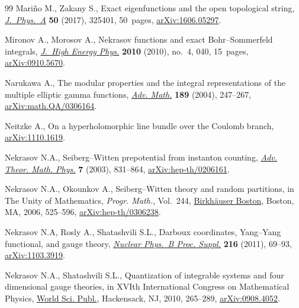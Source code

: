 \documentclass[pdftex]{sigma}
\numberwithin{equation}{section}
\begin{document}
\begin{thebibliography}{99}
Mari\~no M., Zakany S., Exact eigenfunctions and the open topological string,
 \href{https://doi.org/10.1088/1751-8121/aa791e}{\textit{J.~Phys.~A}} \textbf{50} (2017), 325401, 50~pages,
 \href{https://arxiv.org/abs/1606.05297}{arXiv:1606.05297}.

Mironov A., Morosov A., Nekrasov functions and exact {B}ohr--{S}ommerfeld
 integrals, \href{https://doi.org/10.1007/JHEP04(2010)040}{\textit{J.~High Energy Phys.}} \textbf{2010} (2010), no.~4, 040,
 15~pages, \href{https://arxiv.org/abs/0910.5670}{arXiv:0910.5670}.

Narukawa A., The modular properties and the integral representations of the
 multiple elliptic gamma functions, \href{https://doi.org/10.1016/j.aim.2003.11.009}{\textit{Adv. Math.}} \textbf{189} (2004),
 247--267, \href{https://arxiv.org/abs/math.QA/0306164}{arXiv:math.QA/0306164}.

Neitzke A., On a hyperholomorphic line bundle over the {C}oulomb branch,
 \href{https://arxiv.org/abs/1110.1619}{arXiv:1110.1619}.

Nekrasov N.A., Seiberg--{W}itten prepotential from instanton counting,
 \href{https://dx.doi.org/10.4310/ATMP.2003.v7.n5.a4}{\textit{Adv. Theor. Math. Phys.}} \textbf{7} (2003), 831--864,
 \href{https://arxiv.org/abs/hep-th/0206161}{arXiv:hep-th/0206161}.

Nekrasov N.A., Okounkov A., Seiberg--{W}itten theory and random partitions, in
 The Unity of Mathematics, \textit{Progr. Math.}, Vol.~244, \href{https://doi.org/10.1007/0-8176-4467-9_15}{Birkh\"auser
 Boston}, Boston, MA, 2006, 525--596, \href{https://arxiv.org/abs/hep-th/0306238}{arXiv:hep-th/0306238}.

Nekrasov N.A, Rosly A., Shatashvili S.L., Darboux coordinates, {Y}ang--{Y}ang
 functional, and gauge theory, \href{https://doi.org/10.1016/j.nuclphysbps.2011.04.150}{\textit{Nuclear Phys.~B Proc. Suppl.}}
 \textbf{216} (2011), 69--93, \href{https://arxiv.org/abs/1103.3919}{arXiv:1103.3919}.

Nekrasov N.A., Shatashvili S.L., Quantization of integrable systems and four
 dimensional gauge theories, in X{VI}th {I}nternational {C}ongress on
 {M}athematical {P}hysics, \href{https://doi.org/10.1142/9789814304634_0015}{World Sci. Publ.}, Hackensack, NJ, 2010, 265--289,
 \href{https://arxiv.org/abs/0908.4052}{arXiv:0908.4052}.


\end{thebibliography}
\end{document}
